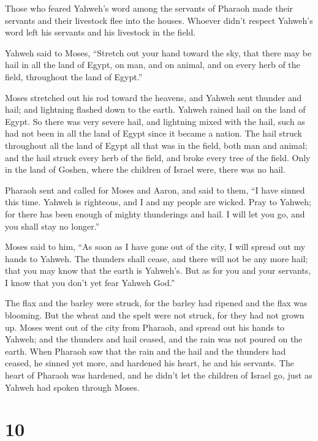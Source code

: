  Those who feared Yahweh's word among the servants of
Pharaoh made their servants and their livestock flee into the houses.
 Whoever didn't respect Yahweh's word left his servants and
his livestock in the field.

 Yahweh said to Moses, ``Stretch out your hand toward the
sky, that there may be hail in all the land of Egypt, on man, and on
animal, and on every herb of the field, throughout the land of Egypt.''

 Moses stretched out his rod toward the heavens, and Yahweh
sent thunder and hail; and lightning flashed down to the earth. Yahweh
rained hail on the land of Egypt.  So there was very severe
hail, and lightning mixed with the hail, such as had not been in all the
land of Egypt since it became a nation.  The hail struck
throughout all the land of Egypt all that was in the field, both man and
animal; and the hail struck every herb of the field, and broke every
tree of the field.  Only in the land of Goshen, where the
children of Israel were, there was no hail.

 Pharaoh sent and called for Moses and Aaron, and said to
them, ``I have sinned this time. Yahweh is righteous, and I and my
people are wicked.  Pray to Yahweh; for there has been
enough of mighty thunderings and hail. I will let you go, and you shall
stay no longer.''

 Moses said to him, ``As soon as I have gone out of the
city, I will spread out my hands to Yahweh. The thunders shall cease,
and there will not be any more hail; that you may know that the earth is
Yahweh's.  But as for you and your servants, I know that
you don't yet fear Yahweh God.''

 The flax and the barley were struck, for the barley had
ripened and the flax was blooming.  But the wheat and the
spelt were not struck, for they had not grown up.  Moses
went out of the city from Pharaoh, and spread out his hands to Yahweh;
and the thunders and hail ceased, and the rain was not poured on the
earth.  When Pharaoh saw that the rain and the hail and the
thunders had ceased, he sinned yet more, and hardened his heart, he and
his servants.  The heart of Pharaoh was hardened, and he
didn't let the children of Israel go, just as Yahweh had spoken through
Moses.

\hypertarget{section-9}{%
\section{10}\label{section-9}}


